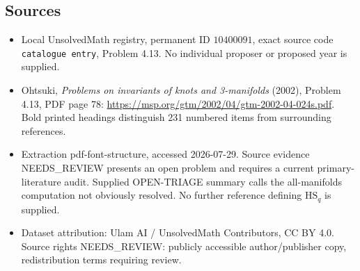 \documentclass[11pt]{article}
\begin{document}
\subsection{Sources}
\begin{itemize}
\item Local UnsolvedMath registry, permanent ID \(10400091\), exact source code \texttt{catalogue entry}, Problem 4.13. No individual proposer or proposed year is supplied.
\item Ohtsuki, \emph{Problems on invariants of knots and 3-manifolds} (2002), Problem 4.13, PDF page 78: \url{https://msp.org/gtm/2002/04/gtm-2002-04-024s.pdf}. Bold printed headings distinguish 231 numbered items from surrounding references.
\item Extraction pdf-font-structure, accessed 2026-07-29. Source evidence NEEDS\_REVIEW presents an open problem and requires a current primary-literature audit. Supplied OPEN-TRIAGE summary calls the all-manifolds computation not obviously resolved. No further reference defining \(\mathrm{HS}_q\) is supplied.
\item Dataset attribution: Ulam AI / UnsolvedMath Contributors, CC BY 4.0. Source rights NEEDS\_REVIEW: publicly accessible author/publisher copy, redistribution terms requiring review.
\end{itemize}
\end{document}
